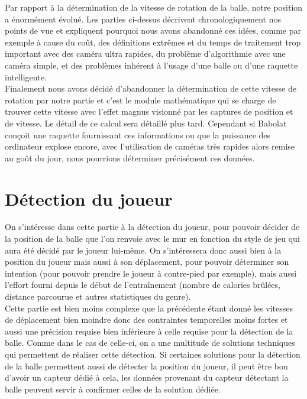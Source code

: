 Par rapport à la détermination de la vitesse de rotation de la balle, notre position a énormément évolué. Les parties ci-dessus décrivent chronologiquement nos points de vue et expliquent pourquoi nous avons abandonné ces idées, comme par exemple à cause du coût, des définitions extrêmes et du temps de traitement trop important avec des caméra ultra rapides, du problème d'algorithmie avec une caméra simple, et des problèmes inhérent à l'usage d'une balle ou d'une raquette intelligente.\\

Finalement nous avons décidé d'abandonner la détermination de cette vitesse de rotation par notre partie et c'est le module mathématique qui se charge de trouver cette vitesse avec l'effet magnus visionné par les captures de position et de vitesse. Le détail de ce calcul sera détaillé plus tard. Cependant si Babolat conçoit une raquette fournissant ces informations ou que la puissance des ordinateur explose encore, avec l'utilisation de caméras très rapides alors remise au goût du jour, nous pourrions déterminer précisément ces données.





























\chapter{Détection du joueur}

On s'intéresse dans cette partie à la détection du joueur, pour pouvoir décider de la position de la balle que l'on renvoie avec le mur en fonction du style de jeu qui aura été décidé par le joueur lui-même. On s'intéressera donc aussi bien à la position du joueur mais aussi à son déplacement, pour pouvoir déterminer son intention (pour pouvoir prendre le joueur à contre-pied par exemple), mais aussi l'effort fourni depuis le début de l'entraînement (nombre de calories brûlées, distance parcourue et autres statistiques du genre). \\

Cette partie est bien moins complexe que la précédente étant donné les vitesses de déplacement bien moindre donc des contraintes temporelles moins fortes et aussi une précision requise bien inférieure à celle requise pour la détection de la balle. Comme dans le cas de celle-ci, on a une multitude de solutions techniques qui permettent de réaliser cette détection. Si certaines solutions pour la détection de la balle permettent aussi de détecter la position du joueur, il peut être bon d'avoir un capteur dédié à cela, les données provenant du capteur détectant la balle peuvent servir à confirmer celles de la solution dédiée.


